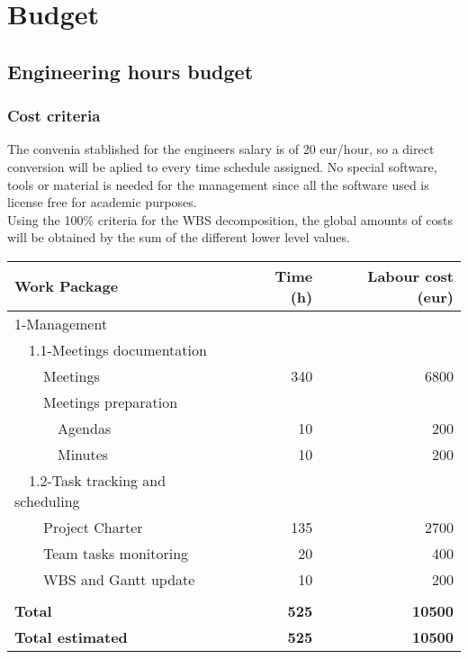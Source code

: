 \section{Budget}


\subsection{Engineering hours budget}

\subsubsection{Cost criteria} 
The convenia stablished for the engineers salary is of 20 eur/hour, so a direct conversion will be aplied to every time schedule assigned. No special software, tools or material is needed for the management since all the software used is license free for academic purposes.\\
Using the 100\% criteria for the WBS decomposition, the global amounts of costs will be obtained by the sum of the different lower level values. \\

\begin{tabular}{ | l | r | r | }
\hline
Work Package & Time (h) & Labour cost (eur) \\ \hline
1-Management &  &  \\ \hline
~~1.1-Meetings documentation & & \\ \hline
~~~~Meetings & 340 & 6800 \\ \hline
~~~~Meetings preparation & & \\ \hline
~~~~~~Agendas & 10 & 200 \\ \hline
~~~~~~Minutes & 10 & 200 \\ \hline
~~1.2-Task tracking and scheduling & & \\ \hline
~~~~Project Charter & 135 & 2700 \\ \hline
~~~~Team tasks monitoring & 20 & 400 \\ \hline
~~~~WBS and Gantt update & 10 & 200 \\ \hline
 &  &  \\ \hline
\textbf{Total} & \textbf{525} & \textbf{10500} \\ \hline
\textbf{Total estimated} & \textbf{525} & \textbf{10500} \\
\hline
\end{tabular}
 


